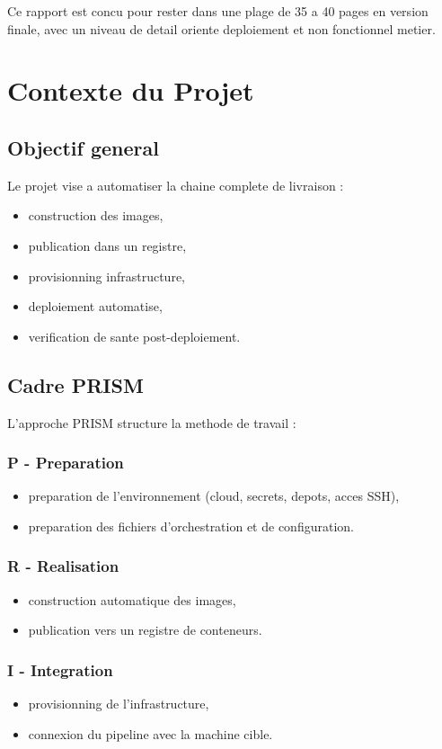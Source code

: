 \documentclass[12pt,a4paper]{report}
\begin{document}
Ce rapport est concu pour rester dans une plage de 35 a 40 pages en version finale,
avec un niveau de detail oriente deploiement et non fonctionnel metier.

\chapter{Contexte du Projet}
\section{Objectif general}
Le projet vise a automatiser la chaine complete de livraison :
\begin{itemize}
  \item construction des images,
  \item publication dans un registre,
  \item provisionning infrastructure,
  \item deploiement automatise,
  \item verification de sante post-deploiement.
\end{itemize}

\section{Cadre PRISM}
L'approche PRISM structure la methode de travail :

\subsection{P - Preparation}
\begin{itemize}
  \item preparation de l'environnement (cloud, secrets, depots, acces SSH),
  \item preparation des fichiers d'orchestration et de configuration.
\end{itemize}

\subsection{R - Realisation}
\begin{itemize}
  \item construction automatique des images,
  \item publication vers un registre de conteneurs.
\end{itemize}

\subsection{I - Integration}
\begin{itemize}
  \item provisionning de l'infrastructure,
  \item connexion du pipeline avec la machine cible.
\end{itemize}
\end{document}
